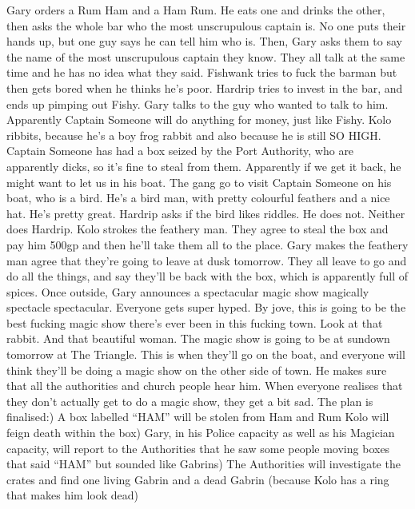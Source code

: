 Gary orders a Rum Ham and a Ham Rum. He eats one and drinks the other, then asks the whole bar who the most unscrupulous captain is. No one puts their hands up, but one guy says he can tell him who is. Then, Gary asks them to say the name of the most unscrupulous captain they know. They all talk at the same time and he has no idea what they said.\medskip
Fishwank tries to fuck the barman but then gets bored when he thinks he’s poor.\medskip
Hardrip tries to invest in the bar, and ends up pimping out Fishy.\medskip
Gary talks to the guy who wanted to talk to him. Apparently Captain Someone will do anything for money, just like Fishy. Kolo ribbits, because he’s a boy frog rabbit and also because he is still SO HIGH.\medskip
Captain Someone has had a box seized by the Port Authority, who are apparently dicks, so it’s fine to steal from them. Apparently if we get it back, he might want to let us in his boat.\medskip
The gang go to visit Captain Someone on his boat, who is a bird.\medskip
He’s a bird man, with pretty colourful feathers and a nice hat. He’s pretty great.\medskip
Hardrip asks if the bird likes riddles. He does not. Neither does Hardrip.\medskip
Kolo strokes the feathery man.\medskip
They agree to steal the box and pay him 500gp and then he’ll take them all to the place.\medskip
Gary makes the feathery man agree that they’re going to leave at dusk tomorrow.\medskip
They all leave to go and do all the things, and say they’ll be back with the box, which is apparently full of spices.\medskip
Once outside, Gary announces a spectacular magic show magically spectacle spectacular. Everyone gets super hyped. By jove, this is going to be the best fucking magic show there’s ever been in this fucking town. Look at that rabbit. And that beautiful woman. The magic show is going to be at sundown tomorrow at The Triangle.\medskip
This is when they’ll go on the boat, and everyone will think they’ll be doing a magic show on the other side of town. He makes sure that all the authorities and church people hear him.\medskip
When everyone realises that they don’t actually get to do a magic show, they get a bit sad.\medskip
The plan is finalised:) A box labelled “HAM” will be stolen from Ham and Rum Kolo will feign death within the box) Gary, in his Police capacity as well as his Magician capacity, will report to the Authorities that he saw some people moving boxes that said “HAM” but sounded like Gabrins) The Authorities will investigate the crates and find one living Gabrin and a dead Gabrin (because Kolo has a ring that makes him look dead)\medskip
